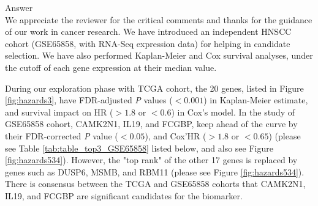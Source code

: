 \documentclass[preprint,12pt]{elsarticle}
\newenvironment{MyColorPar}[1]{%
    \leavevmode\color{#1}\ignorespaces%
}{%
}%
\begin{document}
%
\begin{MyColorPar}{blue}
Answer\\


We appreciate the reviewer for the critical comments and thanks for the guidance of our work in cancer research.
We have introduced an independent HNSCC cohort (GSE65858, with RNA-Seq expression data) for helping in candidate selection.
We have also performed Kaplan-Meier and Cox survival analyses, under the cutoff of each gene expression at their median value.

During our exploration phase with TCGA cohort, the 20 genes, listed
in Figure \ref{fig:hazards3}, have FDR-adjusted \textit{P} values ($<0.001$) in Kaplan-Meier estimate, and survival impact on HR ($> 1.8$ or $< 0.6$) in Cox's model.
%
In the study of GSE65858 cohort, CAMK2N1, IL19, and FCGBP, keep ahead of the curve by their FDR-corrected \textit{P} value ($< 0.05$), and Cox'HR ($>1.8$ or $<0.65$) (please see Table \ref{tab:table_top3_GSE65858} listed below,
and also see Figure \ref{fig:hazards534}).
However, the "top rank" of the other 17 genes is replaced by genes such as DUSP6, MSMB, and RBM11 (please see Figure \ref{fig:hazards534}).
There is consensus between the TCGA and GSE65858 cohorts that CAMK2N1, IL19, and FCGBP are significant candidates for the biomarker.


\end{MyColorPar}
\end{document}
